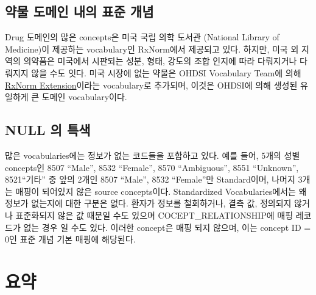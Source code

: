 \documentclass[11pt]{book}
\theoremstyle{definition}
\theoremstyle{definition}
\theoremstyle{definition}
\theoremstyle{remark}
\begin{document}
\subsection{약물 도메인 내의 표준 개념}\label{rxNormExtension}

Drug 도메인의 많은 concepts은 미국 국립 의학 도서관 (National Library of
Medicine)이 제공하는 vocabulary인 RxNorm에서 제공되고 있다. 하지만, 미국
외 지역의 의약품은 미국에서 시판되는 성분, 형태, 강도의 조합 인지에 따라
다뤄지거나 다뤄지지 않을 수도 잇다. 미국 시장에 없는 약물은 OHDSI
Vocabulary Team에 의해
\href{https://www.ohdsi.org/web/wiki/doku.php?id=documentation:vocabulary:rxnorm_extension}{RxNorm
Extension}이라는 vocabulary로 추가되며, 이것은 OHDSI에 의해 생성된
유일하게 큰 도메인 vocabulary이다.

\subsection{NULL 의 특색}\label{null--}

많은 vocabularies에는 정보가 없는 코드들을 포함하고 있다. 예를 들어,
5개의 성별 concepts인 8507 ``Male'', 8532 ``Female'', 8570
``Ambiguous'', 8551 ``Unknown'', 8521``기타'' 중 앞의 2개인 8507
``Male'', 8532 ``Female''만 Standard이며, 나머지 3개는 매핑이 되어있지
않은 source concepts이다. Standardized Vocabularies에서는 왜 정보가
없는지에 대한 구분은 없다. 환자가 정보를 철회하거나, 결측 값, 정의되지
않거나 표준화되지 않은 값 때문일 수도 있으며 COCEPT\_RELATIONSHIP에 매핑
레코드가 없는 경우 일 수도 있다. 이러한 concept은 매핑 되지 않으며, 이는
concept ID = 0인 표준 개념 기본 매핑에 해당된다.

\section{요약}\label{-3}
\end{document}

